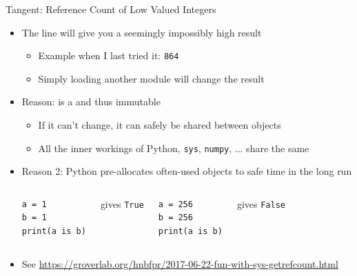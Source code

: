 \begin{frame}[fragile]{Tangent: Reference Count of Low Valued Integers}
%
\begin{itemize}
\item The line  will give you a seemingly impossibly high result
	\begin{itemize}
	\item Example when I last tried it: \texttt{864}
	\item Simply loading another module will change the result
	\end{itemize}
\item Reason:  is a  and thus immutable
	\begin{itemize}
	\item If it can't change, it can safely be shared between objects
	\item All the inner workings of Python, \texttt{sys}, \texttt{numpy}, ... share the same 
	\end{itemize}
\item Reason 2: Python pre-allocates often-used objects to safe time in the long run
	\begin{columns}
\begin{verbatim}
a = 1
b = 1
print(a is b)
\end{verbatim}
		gives \texttt{True}
\begin{verbatim}
a = 256
b = 256
print(a is b)
\end{verbatim}
		gives \texttt{False}
	\end{columns}
\item See \url{https://groverlab.org/hnbfpr/2017-06-22-fun-with-sys-getrefcount.html}
\end{itemize}
%
\end{frame}


